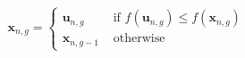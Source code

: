 \begin{equation}
\mathbf{x}_{n, g}=\left\{\begin{array}{ll}{\mathbf{u}_{n, g}} & {\text { if } f\left(\mathbf{u}_{n, g}\right) \leq f\left(\mathbf{x}_{n, g}\right)} \\ {\mathbf{x}_{n, g-1}} & {\text { otherwise }}\end{array}\right.
\label{selection}
\end{equation}